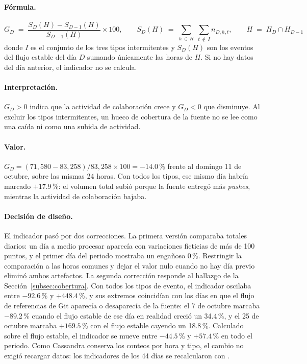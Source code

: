 \paragraph{Fórmula.}
\[
G_D \;=\; \frac{S_D(H) - S_{D-1}(H)}{S_{D-1}(H)} \times 100,
\qquad S_D(H) \;=\; \sum_{h \,\in\, H} \; \sum_{t \,\notin\, I} n_{D,h,t},
\qquad H \;=\; H_D \cap H_{D-1}
\]
donde $I$ es el conjunto de los tres tipos intermitentes y $S_D(H)$ son los eventos del flujo estable del día $D$ sumando únicamente las horas de $H$. Si no hay datos del día anterior, el indicador no se calcula.

\paragraph{Interpretación.} $G_D > 0$ indica que la actividad de colaboración crece y $G_D < 0$ que disminuye. Al excluir los tipos intermitentes, un hueco de cobertura de la fuente no se lee como una caída ni como una subida de actividad.

\paragraph{Valor.} $G_D = (71{,}580 - 83{,}258) / 83{,}258 \times 100 = -14.0$\,\% frente al domingo 11 de octubre, sobre las mismas 24 horas. Con todos los tipos, ese mismo día habría marcado $+17.9$\,\%: el volumen total subió porque la fuente entregó más \textit{pushes}, mientras la actividad de colaboración bajaba.

\paragraph{Decisión de diseño.} El indicador pasó por dos correcciones. La primera versión comparaba totales diarios: un día a medio procesar aparecía con variaciones ficticias de más de 100 puntos, y el primer día del periodo mostraba un engañoso 0\,\%. Restringir la comparación a las horas comunes y dejar el valor nulo cuando no hay día previo eliminó ambos artefactos. La segunda corrección responde al hallazgo de la Sección~\ref{subsec:cobertura}. Con todos los tipos de evento, el indicador oscilaba entre $-92.6$\,\% y $+448.4$\,\%, y sus extremos coincidían con los días en que el flujo de referencias de Git aparecía o desaparecía de la fuente: el 7 de octubre marcaba $-89.2$\,\% cuando el flujo estable de ese día en realidad creció un 34.4\,\%, y el 25 de octubre marcaba $+169.5$\,\% con el flujo estable cayendo un 18.8\,\%. Calculado sobre el flujo estable, el indicador se mueve entre $-44.5$\,\% y $+57.4$\,\% en todo el periodo. Como Cassandra conserva los conteos por hora y tipo, el cambio no exigió recargar datos: los indicadores de los 44 días se recalcularon con .

